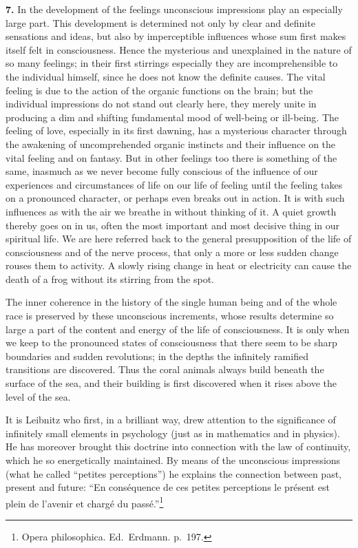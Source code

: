 \documentclass[12pt,a4paper]{book}
\newcommand{\opage}[1]{\marginnote{\footnotesize\textit{[#1]}}}
\begin{document}
\textbf{7.} In the development of the feelings unconscious impressions
play an especially large part. This development is determined not only by clear and
definite sensations and ideas, but also by imperceptible influences
whose sum first makes itself felt in consciousness. Hence the mysterious
and unexplained in the nature of so many feelings; in their first
stirrings especially they are incomprehensible to the individual himself,
since he does not know the definite causes. The vital feeling is due to
the action of the organic functions on the brain; but the individual
impressions do not stand out clearly here, they merely unite in producing
a dim and shifting fundamental mood of well-being or ill-being. The
feeling of love, especially in its first dawning, has a mysterious
character through the awakening of uncomprehended organic instincts and
their influence on the vital feeling and on fantasy. But in other
feelings too there is something of the same, inasmuch as we never become
fully conscious of the influence of our experiences and circumstances of
life on our life of feeling until the feeling takes on a pronounced
character, or perhaps even breaks out in action. It is with such
influences as with the air we breathe in without thinking of it. A quiet
growth thereby goes on in us, often the most important and most decisive
thing in our spiritual life. We are here referred back to the general
presupposition of the life of consciousness and of the nerve process,
that only a more or less sudden change rouses them to activity. A slowly
rising change in heat or electricity can cause the death of a frog
without its stirring from the spot.


\opage{93}The inner coherence in the history of the single human being
and of the whole race is preserved by these unconscious increments, whose
results determine so large a part of the content and energy of the life
of consciousness. It is only when we keep to the pronounced states of
consciousness that there seem to be sharp boundaries and sudden
revolutions; in the depths the infinitely ramified transitions are
discovered. Thus the coral animals always build beneath the surface of
the sea, and their building is first discovered when it rises above the
level of the sea.

It is Leibnitz who first, in a brilliant way, drew attention to the
significance of infinitely small elements in psychology (just as in
mathematics and in physics). He has moreover brought this doctrine into
connection with the law of continuity, which he so energetically
maintained. By means of the unconscious impressions (what he called
``petites perceptions'') he explains the connection between past, present
and future: ``En conséquence de ces petites perceptions le présent est
plein de l’avenir et chargé du
passé.''\footnote{Opera philosophica. Ed.\ Erdmann. p.~197.}
\end{document}
